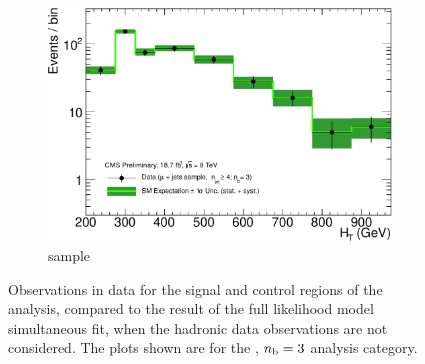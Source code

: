 \begin{figure}[h!]
\begin{subfigure}[b]{0.48\textwidth}
    \includegraphics[width=\textwidth]
    {Figs/results/v0/greenBand/single_plots/muon_3b_ge4j_logy.pdf}
    \caption{\mj sample}
  \end{subfigure}
  \caption{Observations in data for the signal and control
  regions of the analysis, compared to the result of the full likelihood model
  simultaneous fit, when the hadronic data observations are not considered. The
  plots shown are for the \njhigh, $n_{\text{b}} = 3$ analysis category.}
  \label{fig:green_fits_3b_ge4j}
\end{figure}

